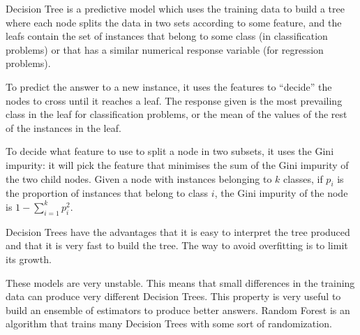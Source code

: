   \begin{pre-delivery}
    Decision Tree\cite{breiman2017classification}\cite{lewis2000introduction}
    is a predictive model which uses
    the training data to build
    a tree where each node splits the data in two sets according to some
    feature, and the leafs contain the set of instances that belong to some class
    (in classification problems) or that has a similar numerical response variable
    (for regression problems).

    To predict the answer to a new instance, it uses the features to ``decide''
    the nodes to cross until it reaches a leaf. The response given is the
    most prevailing class in the leaf for classification problems, or the mean
    of the values of the rest of the instances in the leaf.

    To decide what feature to use to split a node in two subsets, it uses
    the Gini impurity: it will pick the feature that minimises the sum of
    the Gini impurity of the two child nodes. Given a node with instances
    belonging to $k$ classes, if $p_i$ is the proportion of instances that
    belong to class $i$, the Gini impurity of the node is
    $1 - \sum_{i = 1}^k p_i^2$.

    Decision Trees have the advantages that it is easy to interpret the
    tree produced and that it is very fast to build the tree. The way to avoid
    overfitting is to limit its growth.

    These models are very unstable. This means that small differences in the
    training data can produce very different Decision Trees. This property
    is very useful to build an ensemble of estimators to produce better answers.
    Random Forest is an algorithm that trains many Decision Trees with some sort
    of randomization.
  \end{pre-delivery}
